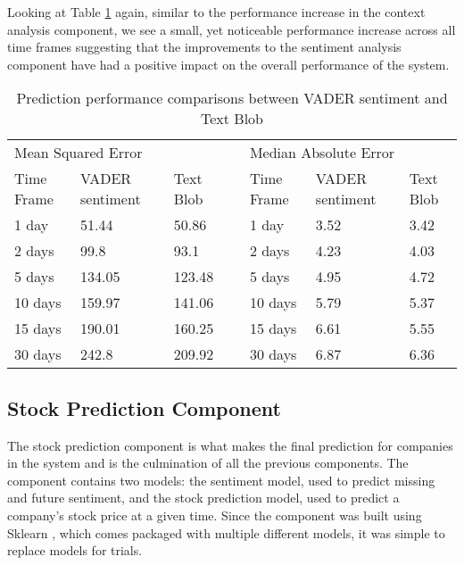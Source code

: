         Looking at Table \ref{Table: sent_Performance} again, similar to the performance increase in the context analysis component, we see a small, yet noticeable performance increase across all time frames suggesting that the improvements to the sentiment analysis component have had a positive impact on the overall performance of the system. 
        
        \begin{table}[h]
            \centering
            \begin{tabular}{|l|l|l|l|l|l|l|}
            \multicolumn{3}{l}{Mean Squared Error}                             & \multicolumn{1}{l}{} & \multicolumn{3}{l}{Median Absolute Error}  \\ 
            \cline{1-3}\cline{5-7}
            Time Frame & VADER sentiment                                     & Text Blob &                      & Time Frame & VADER sentiment & Text Blob             \\ 
            \cline{1-3}\cline{5-7}
            1 day      & {51.44}  & 50.86     &                      & 1 day      & 3.52  & 3.42                  \\ 
            \cline{1-3}\cline{5-7}
            2 days     & {99.8}   & 93.1      &                      & 2 days     & 4.23  & 4.03                  \\ 
            \cline{1-3}\cline{5-7}
            5 days     & {134.05} & 123.48    &                      & 5 days     & 4.95  & 4.72                  \\ 
            \cline{1-3}\cline{5-7}
            10 days    & {159.97} & 141.06    &                      & 10 days    & 5.79  & 5.37                  \\ 
            \cline{1-3}\cline{5-7}
            15 days    & {190.01} & 160.25    &                      & 15 days    & 6.61  & 5.55                  \\ 
            \cline{1-3}\cline{5-7}
            30 days    & {242.8}  & 209.92    &                      & 30 days    & 6.87  & 6.36                  \\
            \cline{1-3}\cline{5-7}
            \end{tabular}
            \bigskip
            \caption{Prediction performance comparisons between VADER sentiment and Text Blob}
            \label{Table: sent_Performance}
        \end{table}
        
        \subsection{Stock Prediction Component}
        \label{eval:prediction}
        The stock prediction component is what makes the final prediction for companies in the system and is the culmination of all the previous components. The component contains two models: the sentiment model, used to predict missing and future sentiment, and the stock prediction model, used to predict a company's stock price at a given time. Since the component was built using Sklearn \citep{technology:Scikit-learn}, which comes packaged with multiple different models, it was simple to replace models for trials.
        
